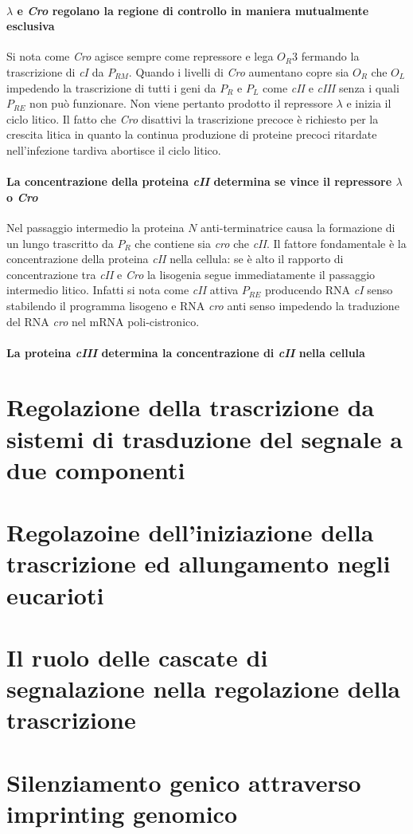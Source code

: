 \paragraph{$\lambda$ e \emph{Cro} regolano la regione di controllo in  maniera mutualmente esclusiva}
Si nota come \emph{Cro} agisce sempre come repressore e lega $O_R3$ fermando la trascrizione di \emph{cI} da $P_{RM}$. Quando i livelli di \emph{Cro} aumentano copre sia $O_R$ che $O_L$
impedendo la trascrizione di tutti i geni da $P_R$ e $P_L$ come \emph{cII} e \emph{cIII} senza i quali $P_{RE}$ non pu\`o funzionare. Non viene pertanto prodotto il repressore
$\lambda$ e inizia il ciclo litico. Il fatto che \emph{Cro} disattivi la trascrizione precoce \`e richiesto per la crescita litica in quanto la continua produzione di proteine 
precoci ritardate nell'infezione tardiva abortisce il ciclo litico. 
\paragraph{La concentrazione della proteina \emph{cII} determina se vince il repressore $\lambda$ o \emph{Cro}}
Nel passaggio intermedio la proteina $N$ anti-terminatrice causa la formazione di un lungo trascritto da $P_R$ che contiene sia \emph{cro} che \emph{cII}. Il fattore fondamentale \`e la
concentrazione della proteina \emph{cII} nella cellula: se \`e alto il rapporto di concentrazione tra \emph{cII} e \emph{Cro} la lisogenia segue immediatamente il passaggio intermedio
litico. Infatti si nota come \emph{cII} attiva $P_{RE}$ producendo RNA \emph{cI} senso stabilendo il programma lisogeno e RNA \emph{cro} anti senso impedendo la traduzione del RNA
\emph{cro} nel mRNA poli-cistronico. 
\paragraph{La proteina \emph{cIII} determina la concentrazione di \emph{cII} nella cellula}


\section{Regolazione della trascrizione da sistemi di trasduzione del segnale a due componenti}

\section{Regolazoine dell'iniziazione della trascrizione ed allungamento negli eucarioti}

\section{Il ruolo delle cascate di segnalazione nella regolazione della trascrizione}

\section{Silenziamento genico attraverso imprinting genomico}

